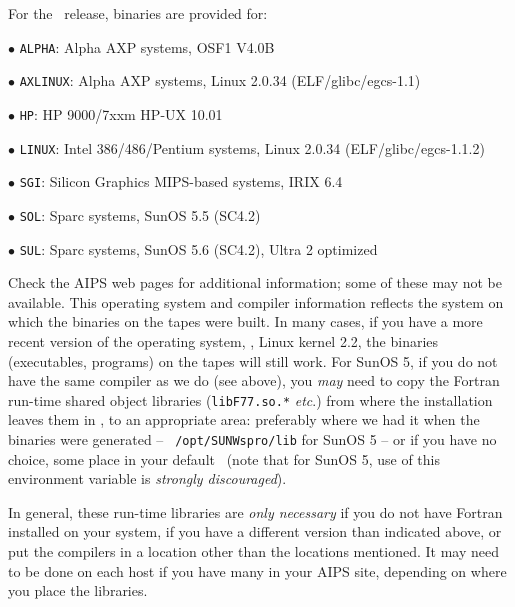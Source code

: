 For the \THISVER\ release,
binaries are provided for:\medskip

\item{$\bullet$} {\tt ALPHA}: Alpha AXP systems, OSF1 V4.0B
\item{$\bullet$} {\tt AXLINUX}: Alpha AXP systems, Linux 2.0.34
		 (ELF/glibc/egcs-1.1)
\item{$\bullet$} {\tt HP}: HP 9000/7xxm HP-UX 10.01
\item{$\bullet$} {\tt LINUX}: Intel 386/486/Pentium systems, Linux
                 2.0.34 (ELF/glibc/egcs-1.1.2)
\item{$\bullet$} {\tt SGI}: Silicon Graphics MIPS-based systems, IRIX
                 6.4
\item{$\bullet$} {\tt SOL}: Sparc systems, SunOS 5.5 (SC4.2)
\item{$\bullet$} {\tt SUL}: Sparc systems, SunOS 5.6 (SC4.2), Ultra 2
                 optimized
\medskip

\noindent
Check the AIPS web pages for additional information; some of these may
not be available.  This operating system and compiler information
reflects the system on which the binaries on the tapes were built.  In
many cases, if you have a more recent version of the operating system,
\eg, Linux kernel 2.2, the binaries (executables, programs) on the tapes
will still work.  For SunOS 5, if you do not have the same compiler as we
do (see above), you {\it may\/} need to copy the Fortran run-time shared
object libraries ({\tt libF77.so.*} {\it etc\/}.) from where the
installation leaves them in \AROOT, to an appropriate area: preferably
where we had it when the binaries were generated -- {\tt
/opt/SUNWspro/lib} for SunOS 5 -- or if you have no choice, some place in
your default \LDLIB\ (note that for SunOS 5, use of this environment
variable is {\it strongly discouraged\/}).

In general, these run-time libraries are {\it only necessary\/} if you
do not have Fortran installed on your system, if you have a different
version than indicated above, or put the compilers in a location other
than the locations mentioned.  It may need to be done on each host if
you have many in your AIPS site, depending on where you place the
libraries.

